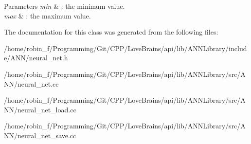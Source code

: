 \begin{DoxyParams}{Parameters}
{\em min} & \+: the minimum value. \\
\hline
{\em max} & \+: the maximum value. \\
\hline
\end{DoxyParams}


The documentation for this class was generated from the following files\+:\begin{DoxyCompactItemize}
\item 
/home/robin\+\_\+f/\+Programming/\+Git/\+C\+P\+P/\+Love\+Brains/api/lib/\+A\+N\+N\+Library/include/\+A\+N\+N/neural\+\_\+net.\+h\item 
/home/robin\+\_\+f/\+Programming/\+Git/\+C\+P\+P/\+Love\+Brains/api/lib/\+A\+N\+N\+Library/src/\+A\+N\+N/neural\+\_\+net.\+cc\item 
/home/robin\+\_\+f/\+Programming/\+Git/\+C\+P\+P/\+Love\+Brains/api/lib/\+A\+N\+N\+Library/src/\+A\+N\+N/neural\+\_\+net\+\_\+load.\+cc\item 
/home/robin\+\_\+f/\+Programming/\+Git/\+C\+P\+P/\+Love\+Brains/api/lib/\+A\+N\+N\+Library/src/\+A\+N\+N/neural\+\_\+net\+\_\+save.\+cc\end{DoxyCompactItemize}
